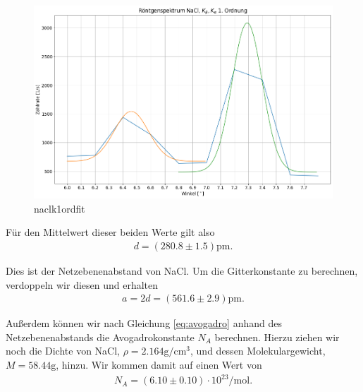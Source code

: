 \begin{figure}[H]
  \centering
  \includegraphics[width=.9\textwidth]{files/plots/nacl_k_1ord_fit.png}
  \caption{naclk1ordfit}
  \label{fig:nacl_k_1ord_fit}
\end{figure}


Für den Mittelwert dieser beiden Werte gilt also
\begin{align}
  d = (280.8 \pm 1.5)\si{\pico\meter}.
\end{align}

Dies ist der Netzebenenabstand von NaCl. Um die Gitterkonstante zu berechnen, verdoppeln wir diesen und erhalten
\begin{align}
  a = 2d = (561.6 \pm 2.9)\si{\pico\meter}.
\end{align}

Außerdem können wir nach Gleichung \eqref{eq:avogadro} anhand des Netzebenenabstands die Avogadrokonstante $N_A$ berechnen. Hierzu ziehen wir noch die Dichte von NaCl, $\rho = 2.164\si{\gram\per\centi\meter\cubed}$, und dessen Molekulargewicht, $M = 58.44\si{\gram}$, hinzu. Wir kommen damit auf einen Wert von
\begin{align}
  N_A = (6.10 \pm 0.10) \cdot 10^{23} \si{\per\mol}.
\end{align}